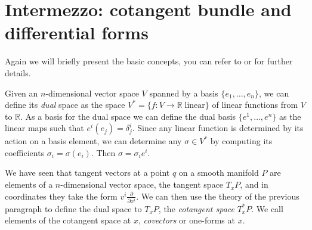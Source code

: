 \documentclass[english,fontsize=11pt,paper=b5]{scrbook}
\theoremstyle{definition}
\begin{document}
    \section{Intermezzo: cotangent bundle and differential forms}

    Again we will briefly present the basic concepts, you can refer to \cite{book:lee} or \cite[Chapters 5-7]{lectures:aom:seri} for further details.

    Given an $n$-dimensional vector space $V$ spanned by a basis $\{e_1, \ldots, e_n\}$, we can define its \emph{dual} space as the space $V^* = \{f : V \to \mathbb{R} \; \mbox{linear}\}$ of linear functions from $V$ to $\mathbb{R}$.
    As a basis for the dual space we can define the dual basis $\{e^1, \ldots, e^n\}$ as the linear maps such that $e^i(e_j) = \delta^i_j$. Since any linear function is determined by its action on a basis element, we can determine any $\sigma \in V^*$ by computing its coefficients $\sigma_i = \sigma(e_i)$. Then $\sigma = \sigma_i e^i$.

    We have seen that tangent vectors at a point $q$ on a smooth manifold $P$ are elements of a $n$-dimensional vector space, the tangent space $T_x P$, and in coordinates they take the form $v^i \frac{\partial}{\partial x^i}$.
    We can then use the theory of the previous paragraph to define the dual space to $T_x P$, the \emph{cotangent space} $T^*_x P$.
    We call elements of the cotangent space at $x$, \emph{covectors} or one-forms at $x$.
\end{document}
